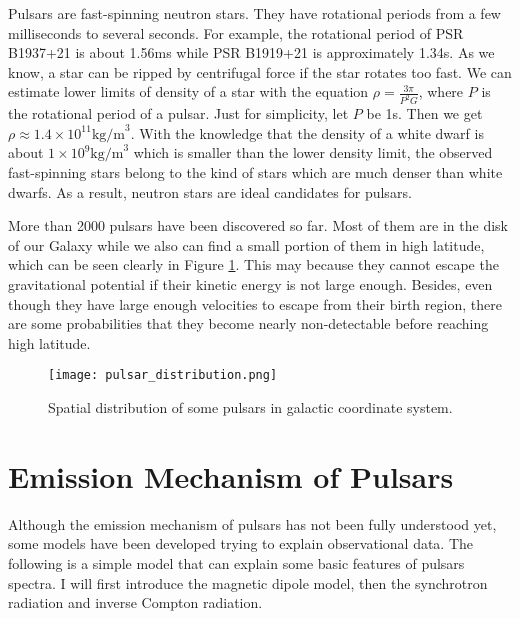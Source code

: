 \documentclass[12pt]{report}
\begin{document}
    Pulsars are fast-spinning neutron stars. They have rotational periods from a few 
    milliseconds to several seconds. For example, the rotational period of PSR B1937+21 is 
    about 1.56ms while PSR B1919+21 is approximately 1.34s. As we know, a star can be ripped 
    by centrifugal force if the star rotates too fast. We can estimate lower limits of 
    density of a star with the equation $\rho=\frac{3\pi}{P^2G}$, where $P$ is the 
    rotational period of a pulsar. Just for simplicity, let $P$ be 1s. Then we 
    get $\rho\approx 1.4\times 10^{11}\mbox{kg/m}^3$. With the knowledge that the 
    density of a white dwarf is about $1\times 10^9\mbox{kg/m}^3$ which is smaller than 
    the lower density limit, the observed fast-spinning stars belong to the kind of stars 
    which are much denser than white dwarfs. As a result, neutron stars are ideal candidates 
    for pulsars. 
    
    More than 2000 pulsars have been discovered so far. Most of them are in the disk of 
    our Galaxy while we also can find a small portion of them in high latitude, which can be 
    seen clearly in Figure \ref{fig: spatial_distribution}. This may 
    because they cannot escape the gravitational potential if their kinetic energy is not 
    large enough. Besides, even though they have large enough velocities to escape from their 
    birth region, there are some probabilities that they become nearly non-detectable before 
    reaching high latitude. 

    \begin{figure}[!htp]
      \centering
      \texttt{[image: pulsar\_distribution.png]}
      \caption{Spatial distribution of some pulsars in galactic coordinate system.}
      \label{fig: spatial_distribution}
    \end{figure}

    
  \section{Emission Mechanism of Pulsars}
    Although the emission mechanism of pulsars has not been fully understood yet, some 
    models have been developed 
    trying to explain observational data. The following is a simple model that can explain 
    some basic features of pulsars spectra. I will first introduce the magnetic dipole model, 
    then the synchrotron radiation and inverse Compton radiation. 
\end{document}
